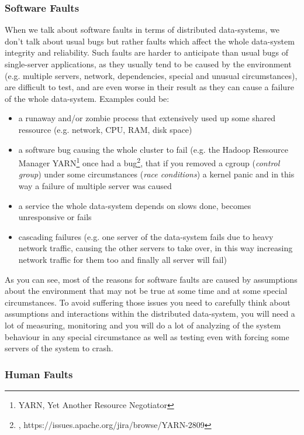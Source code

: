 \subsubsection{Software Faults}
\label{tf_nfreq_reliability_software_faults}
When we talk about software faults in terms of distributed data-systems, we don't talk about usual bugs but rather faults which affect the whole data-system integrity and reliability. Such faults are harder to anticipate than usual bugs of single-server applications, as they usually tend to be caused by the environment (e.g. multiple servers, network, dependencies, special and unusual circumstances), are difficult to test, and are even worse in their result as they can cause a failure of the whole data-system.
Examples could be:
\begin{itemize}
			\item a runaway and/or zombie process that extensively used up some shared ressource (e.g. network, CPU, RAM, disk space)
			\item a software bug causing the whole cluster to fail (e.g. the Hadoop Ressource Manager YARN\footnote{YARN, Yet Another Resource Negotiator} once had a bug\footnote{\cite{YARNKPBUG}, https://issues.apache.org/jira/browse/YARN-2809}, that if you removed a cgroup (\textit{control group}) under some circumstances (\textit{race conditions}) a kernel panic and in this way a failure of multiple server was caused
			\item a service the whole data-system depends on slows done, becomes unresponsive or fails
			\item cascading failures (e.g. one server of the data-system fails due to heavy network traffic, causing the other servers to take over, in this way increasing network traffic for them too and finally all server will fail)\\
\end{itemize}

As you can see, most of the reasons for software faults are caused by assumptions about the environment that may not be true at some time and at some special circumstances. To avoid suffering those issues you need to carefully think about assumptions and interactions within the distributed data-system, you will need a lot of measuring, monitoring and you will do a lot of analyzing of the system behaviour in any special circumstance as well as testing even with forcing some servers of the system to crash.

\subsubsection{Human Faults}
\label{tf_nfreq_reliability_human_faults}

